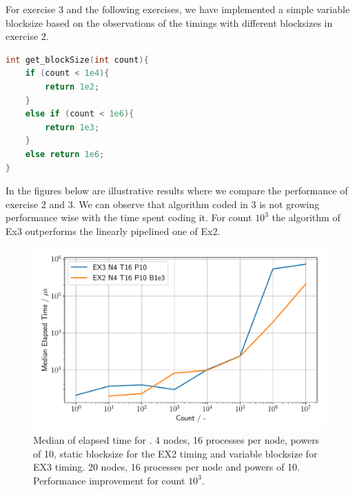 \pagebreak

For exercise 3 and the following exercises, we have implemented a simple variable blocksize based on the observations
of the timings with different blocksizes in exercise 2.

\null
\null

\begin{lstlisting}[language=C, title=C Code for variable blocksize ]
int get_blockSize(int count){
    if (count < 1e4){
        return 1e2;
    }
    else if (count < 1e6){
        return 1e3;
    }
    else return 1e6;
}
\end{lstlisting}

\null
\null
\null


In the figures below are illustrative results where we compare the performance of exercise 2 and 3. We can observe
that algorithm coded in 3 is not growing performance wise with the time spent coding it. For count $10^3$ the
algorithm of Ex3 outperforms the linearly pipelined one of Ex2.\\


\begin{figure}[h]
    \begin{center}
        \includegraphics[width=1\linewidth]{figures/Ex3_1.pdf}
        \caption{Median of elapsed time for . 4 nodes, 16 processes per node, powers of 10,
         static blocksize for the EX2 timing and variable blocksize for EX3 timing. 
         20 nodes, 16 processes per node and powers of 10. Performance improvement for count $10^3$.}
        \label{Ex3_1_p}
    \end{center}
\end{figure}

\pagebreak

